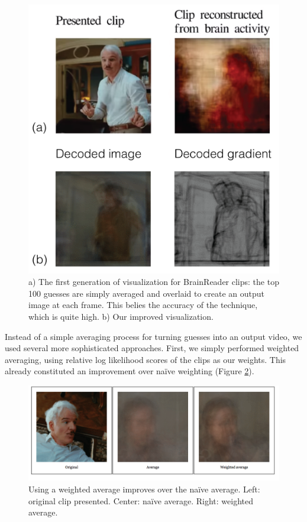 \begin{figure}[t]
\centering
    \includegraphics[width=1.0\columnwidth]{figures/fig1B.png}
\caption{a) The first generation of visualization for BrainReader clips: the top 100 guesses are simply averaged and overlaid to create an output image at each frame.  This belies the accuracy of the technique, which is quite high. b) Our improved visualization.}
\label{fig:avg}
\end{figure}


Instead of a simple averaging process for turning guesses into an output video, we used several more sophisticated approaches.  First, we simply performed weighted averaging, using relative log likelihood scores of the clips as our weights.  This already constituted an improvement over na\"{i}ve weighting (Figure \ref{fig:weighted}).

\begin{figure}[t]
\centering
    \includegraphics[width=1.0\columnwidth]{figures/orig-avg-weighted.png}
\caption{Using a weighted average improves over the na\"{i}ve average.  Left: original clip presented.  Center: na\"{i}ve average.  Right: weighted average.}
\label{fig:weighted}
\end{figure}


